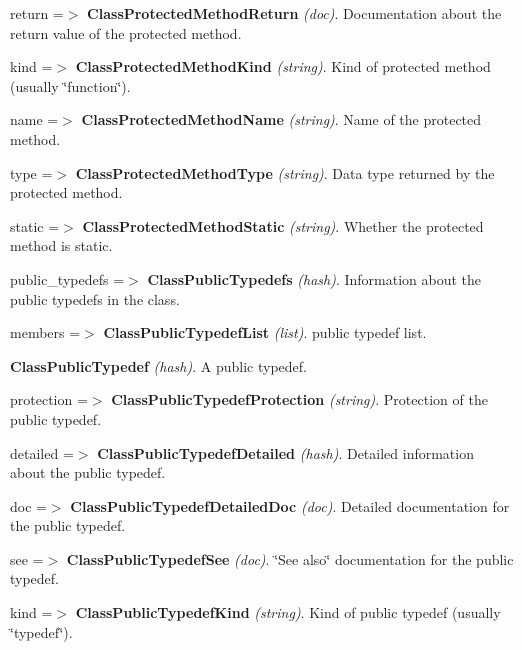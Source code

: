\begin{DoxyItemize}
\begin{DoxyItemize}
\begin{DoxyItemize}
\begin{DoxyItemize}
\begin{DoxyItemize}
\begin{DoxyItemize}
\begin{DoxyItemize}
\begin{DoxyItemize}
\item return =$>$ {\bfseries ClassProtectedMethodReturn} {\itshape (doc)\/}. Documentation about the return value of the protected method. 
\end{DoxyItemize}
\item kind =$>$ {\bfseries ClassProtectedMethodKind} {\itshape (string)\/}. Kind of protected method (usually \char`\"{}function\char`\"{}). 
\item name =$>$ {\bfseries ClassProtectedMethodName} {\itshape (string)\/}. Name of the protected method. 
\item type =$>$ {\bfseries ClassProtectedMethodType} {\itshape (string)\/}. Data type returned by the protected method. 
\item static =$>$ {\bfseries ClassProtectedMethodStatic} {\itshape (string)\/}. Whether the protected method is static. 
\end{DoxyItemize}
\end{DoxyItemize}
\end{DoxyItemize}
\item public\_\-typedefs =$>$ {\bfseries ClassPublicTypedefs} {\itshape (hash)\/}. Information about the public typedefs in the class. 
\begin{DoxyItemize}
\item members =$>$ {\bfseries ClassPublicTypedefList} {\itshape (list)\/}. public typedef list. 
\begin{DoxyItemize}
\item {\bfseries ClassPublicTypedef} {\itshape (hash)\/}. A public typedef. 
\begin{DoxyItemize}
\item protection =$>$ {\bfseries ClassPublicTypedefProtection} {\itshape (string)\/}. Protection of the public typedef. 
\item detailed =$>$ {\bfseries ClassPublicTypedefDetailed} {\itshape (hash)\/}. Detailed information about the public typedef. 
\begin{DoxyItemize}
\item doc =$>$ {\bfseries ClassPublicTypedefDetailedDoc} {\itshape (doc)\/}. Detailed documentation for the public typedef. 
\item see =$>$ {\bfseries ClassPublicTypedefSee} {\itshape (doc)\/}. \char`\"{}See also\char`\"{} documentation for the public typedef. 
\end{DoxyItemize}
\item kind =$>$ {\bfseries ClassPublicTypedefKind} {\itshape (string)\/}. Kind of public typedef (usually \char`\"{}typedef\char`\"{}). 

\end{DoxyItemize}
\end{DoxyItemize}
\end{DoxyItemize}
\end{DoxyItemize}
\end{DoxyItemize}
\end{DoxyItemize}
\end{DoxyItemize}
